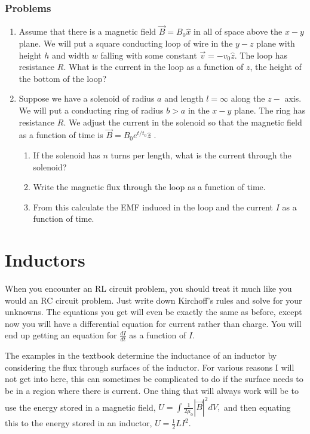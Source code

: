 \documentclass[12pt]{book}
\begin{document}
\subsection{Problems}

\begin{enumerate}
 \item Assume that there is a magnetic field $\vec{B} = B_0 \hat{x}$ in all of space above the $x-y$ plane. We will put a square conducting loop of wire in the $y-z$ plane with height $h$ and width $w$ falling with some constant $\vec{v} = −v_0 \hat{z}.$ The loop has resistance $R.$ What is the current in the loop as a function of $z$, the height of the bottom of the loop?
 \item Suppose we have a solenoid of radius $a$ and length $l = \infty$ along the $z- $ axis. We will put a conducting ring of radius $b > a$ in the $x-y$ plane. The ring has resistance $R$. We adjust the current in the solenoid so that the magnetic field as a function of time is $\vec{B} = B_0 e^{t/t_0} \hat{z}$ .
\begin{enumerate}
 \item If the solenoid has $n$ turns per length, what is the current through the solenoid?
 \item Write the magnetic flux through the loop as a function of time.
 \item From this calculate the EMF induced in the loop and the current $I$ as a function of time.
\end{enumerate}
\end{enumerate}



\chapter{Inductors}

When you encounter an RL circuit problem, you should treat it much like you would an RC circuit problem. Just write down Kirchoff's rules and solve for your unknowns. The equations you get will even be exactly the same as before, except now you will have a differential equation for current rather than charge. You will end up getting an equation for $\frac{dI}{dt}$ as a function of $I.$

The examples in the textbook determine the inductance of an inductor by considering the flux through surfaces of the inductor. For various reasons I will not get into here, this can sometimes be complicated to do if the surface needs to be in a region where there is current. One thing that will always work will be to use the energy stored in a magnetic field, $U = \int \frac{1}{2\mu_0} |\vec{B}|^2 dV,$ and then equating this to the energy stored in an inductor, $U  = \frac{1}{2} LI^2.$
\end{document}
